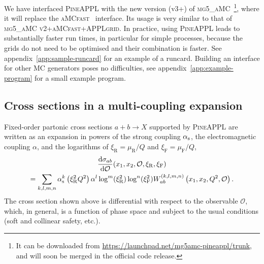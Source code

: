 We have interfaced \textsc{PineAPPL} with the new version (v3+) of \textsc{mg5\_aMC}~\cite{Alwall:2014hca,Frederix:2018nkq}\footnote{It can be downloaded from \url{https://launchpad.net/mg5amc-pineappl/trunk}, and will soon be merged in the official code release.}, where it will replace the \textsc{aMCfast}~\cite{Bertone:2014zva} interface.
Its usage is very similar to that of \textsc{mg5\_aMC v2}+\textsc{aMCfast}+\textsc{APPLgrid}.
In practice, using \textsc{PineAPPL} leads to substantially faster run times, in particular for simple processes, because the grids do not need to be optimised 
and their combination is faster.
See appendix~\ref{app:sample-runcard} for an example of a runcard.
Building an interface for other MC generators poses no difficulties, see appendix~\ref{app:example-program} for a small example program.

\subsection{Cross sections in a multi-coupling expansion}
\label{sec:multi-coupling-expansion}

Fixed-order partonic cross sections $a + b \to X$ supported by \textsc{PineAPPL} are written as an expansion in powers of the strong coupling $\alpha_\mathrm{s}$, the electromagnetic coupling $\alpha$, and the logarithms of $\xi_\mathrm{R} = \mu_\mathrm{R} / Q$ and $\xi_\mathrm{F} = \mu_\mathrm{F} / Q$,
\begin{multline}
\frac{\mathrm{d} \sigma_{ab}}{\mathrm{d} \mathcal{O}} (x_1, x_2, \mathcal{O}, \xi_\mathrm{R}, \xi_\mathrm{F}) \\
= \sum_{k,l,m,n} \alpha_\mathrm{s}^k \left( \xi_\mathrm{R}^2 Q^2 \right) \alpha^l \log^m ( \xi_\mathrm{R}^2 ) \log^n ( \xi_\mathrm{F}^2 ) W_{ab}^{(k,l,m,n)} \left( x_1, x_2, Q^2, \mathcal{O} \right) \text{.}
\label{eq:expansion}
\end{multline}
The cross section shown above is differential with respect to the observable $\mathcal{O}$, which, in general, is a function of phase space and subject to the usual conditions (soft and collinear safety, etc.).

